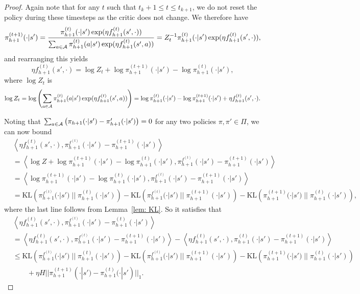 \begin{proof}
    Again note that for any $t$ such that $t_k+1 \leq t \leq t_{k+1}$, we do not reset the policy during these timesteps as the critic does not change. We therefore have
\begin{align}\pi_{h+1}^{(t+1)}(\cdot | s') = \frac{\pi_{h+1}^{(t)}(\cdot | s') \exp(\eta f_{h+1}^{(t)}(s', \cdot))}{\sum_{a \in {\mathcal{A}}} \pi_{h+1}^{(t)}(a | s') \exp(\eta f_{h+1}^{(t)}(s', a))} = Z_t^{-1}\pi_{h+1}^{(t)}(\cdot | s') \exp(\eta f_{h+1}^{(t)}(s', \cdot)),\end{align}
and rearranging this yields
$$\eta f_{h+1}^{(t)}(s', \cdot) = \log Z_t + \log \pi_{h+1}^{(t+1)}(\cdot | s') - \log \pi_{h+1}^{(t)}(\cdot | s'),$$
where $\log Z_t$ is
$$\log Z_t = \log\left(\sum_{a \in {\mathcal{A}}} \pi_{h+1}^{(t)}(a | s') \exp(\eta f_{h+1}^{(t)}(s', a))\right) = \log \pi_{h+1}^{(t)}(\cdot | s') - \log \pi_{h+1}^{(t+1)}(\cdot | s') + \eta f_{h+1}^{(t)}(s', \cdot).$$

Noting that $\sum_{a \in {\mathcal{A}}} \left(\pi_{h+1}(\cdot | s') - \pi_{h+1}'(\cdot | s')\right) = 0$ for any two policies $\pi,\pi' \in \Pi$, we can now bound 
\begin{align}\label{eqn:decom-nora-1}
    &\left\langle \eta f_{h+1}^{(t)}(s', \cdot), \pi_{h+1}^{f^{(t)}}(\cdot | s') - \pi_{h+1}^{(t+1)}(\cdot | s')\right\rangle \nonumber\\
    &= \left\langle \log Z + \log \pi_{h+1}^{{(t+1)}}(\cdot | s') - \log \pi_{h+1}^{(t)}(\cdot | s'), \pi_{h+1}^{f^{(t)}}(\cdot | s') - \pi_{h+1}^{(t+1)}(\cdot | s')\right\rangle \nonumber\\ 
    &=\left\langle \log \pi_{h+1}^{{(t+1)}}(\cdot | s') - \log \pi_{h+1}^{(t)}(\cdot | s'), \pi_{h+1}^{f^{(t)}}(\cdot | s') - \pi_{h+1}^{(t+1)}(\cdot | s')\right\rangle \nonumber\\
    &= \text{KL}\left(\pi_{h+1}^{f^{(t)}}(\cdot | s')\; || \;\pi_{h+1}^{(t)}(\cdot | s')\right) - \text{KL}\left(\pi_{h+1}^{f^{(t)}}(\cdot | s')\; || \;\pi_{h+1}^{(t+1)}(\cdot | s')\right) - \text{KL}\left(\pi_{h+1}^{(t+1)}(\cdot | s')\; || \;\pi_{h+1}^{(t)}(\cdot | s')\right),
\end{align}
where the last line follows from Lemma~\ref{lem: KL}. So it satisfies that 
\begin{align}\label{eqn:decom-nora-2}
    &\left\langle \eta f_{h+1}^{(t)}(s', \cdot), \pi_{h+1}^{f^{(t)}}(\cdot | s') - \pi_{h+1}^{(t)}(\cdot | s')\right\rangle \nonumber \\
    &= \left\langle \eta f_{h+1}^{(t)}(s', \cdot), \pi_{h+1}^{f^{(t)}}(\cdot | s') - \pi_{h+1}^{(t+1)}(\cdot | s')\right\rangle - \left\langle \eta f_{h+1}^{(t)}(s', \cdot), \pi_{h+1}^{(t)}(\cdot | s') - \pi_{h+1}^{(t+1)}(\cdot | s')\right\rangle \nonumber\\
    &\leq \text{KL}\left(\pi_{h+1}^{f^{(t)}}(\cdot | s')\; || \;\pi_{h+1}^{(t)}(\cdot | s')\right) - \text{KL}\left(\pi_{h+1}^{f^{(t)}}(\cdot | s')\; || \;\pi_{h+1}^{(t+1)}(\cdot | s')\right) - \text{KL}\left(\pi_{h+1}^{(t+1)}(\cdot | s')\; || \;\pi_{h+1}^{(t)}(\cdot | s')\right)\nonumber \\
    &\qquad + \eta H ||\pi_{h+1}^{(t+1)}(\cdot | s') - \pi_{h+1}^{(t)}(\cdot | s')||_1.
\end{align}


\end{proof}
